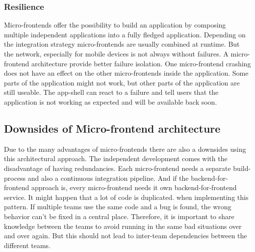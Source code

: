\subsubsection{Resilience}

Micro-frontends offer the possibility to build an application by composing multiple independent applications into a fully fledged application. Depending on the integration strategy micro-frontends are usually combined at runtime. But the network, especially for mobile devices is not always without failures. A micro-frontend architecture provide better failure isolation. One micro-frontend crashing does not have an effect on the other micro-frontends inside the application. Some parts of the application might not work, but other parts of the application are still useable. The app-shell can react to a failure and tell users that the application is not working as expected and will be available back soon. \cite{article:2021:perltonen:background:micro-frontends:motivations-benefits-and-issues}

\subsection{Downsides of Micro-frontend architecture}

Due to the many advantages of micro-frontends there are also a downsides using this architectural approach. The independent development comes with the disadvantage of having redundancies. Each micro-frontend needs a separate build-process and also a continuous integration pipeline. And if the backend-for-frontend approach is, every micro-frontend needs it own backend-for-frontend service. It might happen that a lot of code is duplicated. when implementing this pattern. If multiple teams use the same code and a bug is found, the wrong behavior can't be fixed in a central place. Therefore, it is important to share knowledge between the teams to avoid running in the same bad situations over and over again. But this should not lead to inter-team dependencies between the different teams.
\cite{book:2020:geers:background:micro-frontends:micro-frontends-in-action} 







